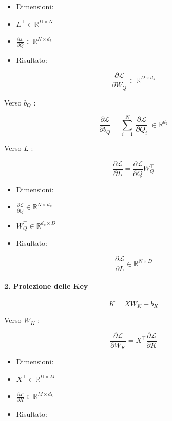 \documentclass[
  11pt,
]{article}
\begin{document}
\begin{itemize}
\item
  Dimensioni:
\item
  \(L^{\top} \in \mathbb{R}^{D \times N}\)
\item
  \(\frac{\partial\mathcal{L}}{\partial Q} \in \mathbb{R}^{N \times d_{k}}\)
\item
  Risultato:
\end{itemize}

\[\frac{\partial\mathcal{L}}{\partial W_{Q}} \in \mathbb{R}^{D \times d_{k}}\]

Verso \(b_{Q}\) :

\[\frac{\partial\mathcal{L}}{\partial b_{Q}} = \sum_{i = 1}^{N}\,\frac{\partial\mathcal{L}}{\partial Q_{i}}\  \in \mathbb{R}^{d_{k}}\]

Verso \(L\) :

\[\frac{\partial\mathcal{L}}{\partial L} = \frac{\partial\mathcal{L}}{\partial Q}W_{Q}^{\top}\]

\begin{itemize}
\item
  Dimensioni:
\item
  \(\frac{\partial\mathcal{L}}{\partial Q} \in \mathbb{R}^{N \times d_{k}}\)
\item
  \(W_{Q}^{\top} \in \mathbb{R}^{d_{k} \times D}\)
\item
  Risultato:
\end{itemize}

\[\frac{\partial\mathcal{L}}{\partial L} \in \mathbb{R}^{N \times D}\]

\paragraph{2. Proiezione delle Key}

\[K = XW_{K} + b_{K}\]

Verso \(W_{K}\) :

\[\frac{\partial\mathcal{L}}{\partial W_{K}} = X^{\top}\frac{\partial\mathcal{L}}{\partial K}\]

\begin{itemize}
\item
  Dimensioni:
\item
  \(X^{\top} \in \mathbb{R}^{D \times M}\)
\item
  \(\frac{\partial\mathcal{L}}{\partial K} \in \mathbb{R}^{M \times d_{k}}\)
\item
  Risultato:
\end{itemize}
\end{document}
